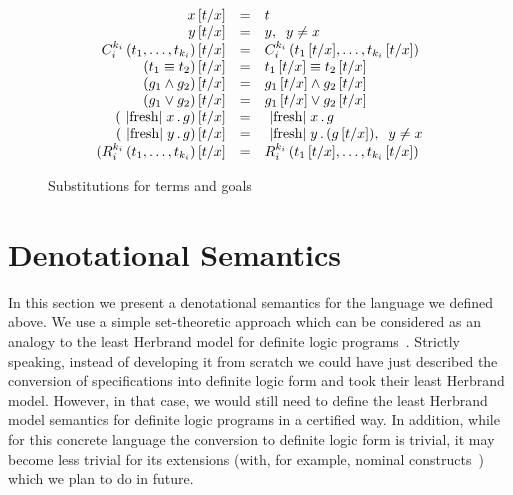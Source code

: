 \begin{figure}[t]
\[
\begin{array}{rcl}
  x\,[t/x] &=& t \\
  y\,[t/x] &=& y,\;\; y\ne x\\
  C_i^{k_i}\,(t_1,\dots,t_{k_i})\,[t/x]&=&C_i^{k_i}\,(t_1\,[t/x],\dots,t_{k_i}\,[t/x])\\
  (t_1 \equiv t_2)\,[t/x]&=&t_1\,[t/x] \equiv t_2\,[t/x]\\
  (g_1 \wedge g_2)\,[t/x]&=&g_1\,[t/x] \wedge g_2\,[t/x]\\
  (g_1 \vee g_2)\,[t/x]&=&g_1\,[t/x] \vee g_2\,[t/x]\\
  (\mbox{\lstinline|fresh|}\;x\,.\,g)\,[t/x]&=&\mbox{\lstinline|fresh|}\;x\,.\,g\\
  (\mbox{\lstinline|fresh|}\;y\,.\,g)\,[t/x]&=&\mbox{\lstinline|fresh|}\;y\,.\,(g\,[t/x]),\;\;y\ne x\\
  (R_i^{k_i}\,(t_1,\dots,t_{k_i})\,[t/x]&=&R_i^{k_i}\,(t_1\,[t/x],\dots,t_{k_i}\,[t/x])
\end{array}
\]
  \caption{Substitutions for terms and goals}
  \label{substitution}
\end{figure}

\section{Denotational Semantics}
\label{denotational}

In this section we present a denotational semantics for the language we defined above. We use a simple set-theoretic
approach which can be considered as an analogy to the least Herbrand model for definite logic programs~\cite{LHM}.
Strictly speaking, instead of developing it from scratch we could have just described the conversion of specifications
into definite logic form and took their least Herbrand model. However, in that case, we would still need to define
the least Herbrand model semantics for definite logic programs in a certified way. In addition, while for
this concrete language the conversion to definite logic form is trivial, it may become less trivial for
its extensions (with, for example, nominal constructs~\cite{AlphaKanren}) which we plan to do in future.

